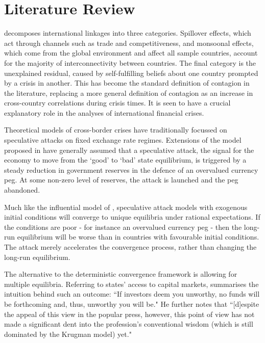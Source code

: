 \documentclass[../base.tex]{subfiles}
\begin{document}
\section{Literature Review}
\label{lit}

\cite{masson1998contagion} decomposes international linkages into three categories. Spillover effects, which act through channels such as trade and competitiveness, and monsoonal effects, which come from the global environment and affect all sample countries, account for the majority of interconnectivity between countries. The final category is the unexplained residual, caused by self-fulfilling beliefs about one country prompted by a crisis in another. This has become the standard definition of contagion in the literature, replacing a more general definition of contagion as an increase in cross-country correlations during crisis times. It is seen to have a crucial explanatory role in the analyses of international financial crises. 

Theoretical models of cross-border crises have traditionally focussed on speculative attacks on fixed exchange rate regimes. Extensions of the model proposed in \cite{krugman1979model} have generally assumed that a speculative attack, the signal for the economy to move from the `good' to `bad' state equilibrium, is triggered by a steady reduction in government reserves in the defence of an overvalued currency peg. At some non-zero level of reserves, the attack is launched and the peg abandoned.

Much like the influential model of \cite{barro1983rules}, speculative attack models with exogenous initial conditions will converge to unique equilibria under rational expectations. If the conditions are poor - for instance an overvalued currency peg - then the long-run equilibrium will be worse than in countries with favourable initial conditions. The attack merely accelerates the convergence process, rather than changing the long-run equilibrium.


The alternative to the deterministic convergence framework is allowing for multiple equilibria. Referring to states' access to capital markets, \cite{calvo1995varieties} summarises the intuition behind such an outcome: ``If investors deem you unworthy, no funds will be forthcoming and, thus, unworthy you will be." He further notes that ``[d]espite the appeal of this view in the popular press, however, this point of view has not made a significant dent into the profession's conventional wisdom (which is still dominated by the Krugman model) yet."
\end{document}
